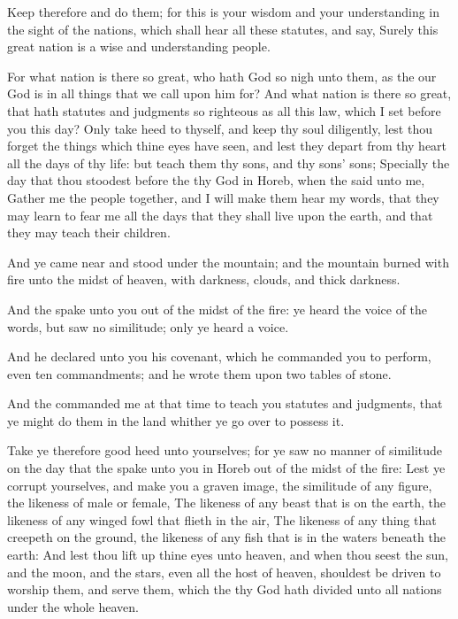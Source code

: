 \verse Keep therefore and do them; for this is your wisdom and your understanding in the sight of the nations, which shall hear all these statutes, and say, Surely this great nation is a wise and understanding people.

\verse For what nation is there so great, who hath God so nigh unto them, as the \LORD our God is in all things that we call upon him for?  \verse And what nation is there so great, that hath statutes and judgments so righteous as all this law, which I set before you this day?  \verse Only take heed to thyself, and keep thy soul diligently, lest thou forget the things which thine eyes have seen, and lest they depart from thy heart all the days of thy life: but teach them thy sons, and thy sons' sons; \verse Specially the day that thou stoodest before the \LORD thy God in Horeb, when the \LORD said unto me, Gather me the people together, and I will make them hear my words, that they may learn to fear me all the days that they shall live upon the earth, and that they may teach their children.

\verse And ye came near and stood under the mountain; and the mountain burned with fire unto the midst of heaven, with darkness, clouds, and thick darkness.

\verse And the \LORD spake unto you out of the midst of the fire: ye heard the voice of the words, but saw no similitude; only ye heard a voice.

\verse And he declared unto you his covenant, which he commanded you to perform, even ten commandments; and he wrote them upon two tables of stone.

\verse And the \LORD commanded me at that time to teach you statutes and judgments, that ye might do them in the land whither ye go over to possess it.

\verse Take ye therefore good heed unto yourselves; for ye saw no manner of similitude on the day that the \LORD spake unto you in Horeb out of the midst of the fire: \verse Lest ye corrupt yourselves, and make you a graven image, the similitude of any figure, the likeness of male or female, \verse The likeness of any beast that is on the earth, the likeness of any winged fowl that flieth in the air, \verse The likeness of any thing that creepeth on the ground, the likeness of any fish that is in the waters beneath the earth: \verse And lest thou lift up thine eyes unto heaven, and when thou seest the sun, and the moon, and the stars, even all the host of heaven, shouldest be driven to worship them, and serve them, which the \LORD thy God hath divided unto all nations under the whole heaven.

